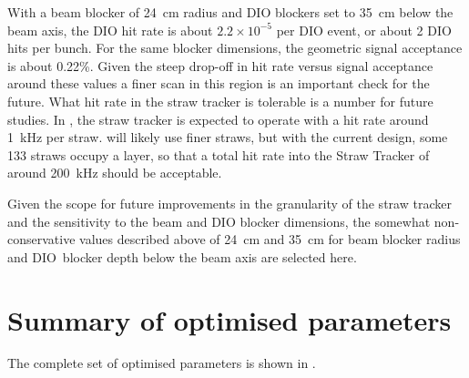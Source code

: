 With a beam blocker of 24~cm radius and DIO blockers set to 35~cm below the beam axis, the DIO hit rate is about $2.2\times10^{-5}$ per DIO event, or about 2 DIO hits per bunch.
For the same blocker dimensions, the geometric signal acceptance is about 0.22\%.
Given the steep drop-off in hit rate versus signal acceptance around these values a finer scan in this region is an important check for the future.
What hit rate in the straw tracker is tolerable is a number for future studies.  In \phaseI, the straw tracker is expected to operate with a hit rate around 1~kHz per straw.
\phaseII will likely use finer straws, but with the current \phaseI design, some 133 straws occupy a layer, so that a total hit rate into the Straw Tracker of around 200~kHz should be acceptable.

Given the scope for future improvements in the granularity of the \phaseII straw tracker and the sensitivity to the beam and DIO blocker dimensions, the somewhat non-conservative values described above of 24~cm and 35~cm for beam blocker radius and DIO~blocker depth below the beam axis are selected here.

\section{Summary of optimised parameters}
The complete set of optimised parameters is shown in .

